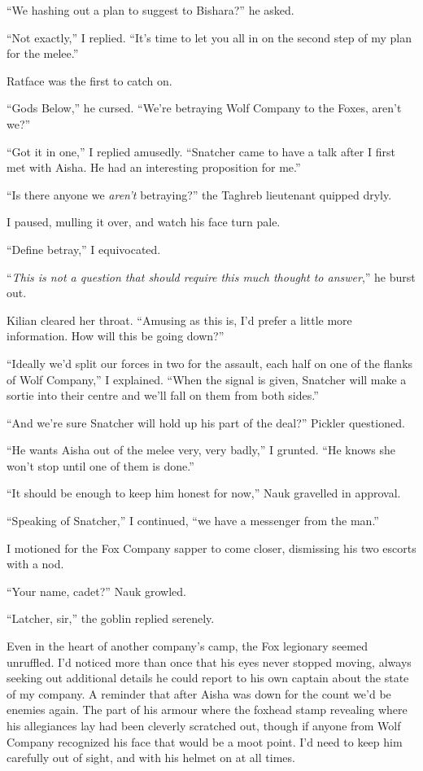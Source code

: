 \documentclass[12pt, openany]{book}
\begin{document}
“We hashing out a plan to suggest to Bishara?” he asked.

“Not exactly,” I replied. “It’s time to let you all in on the second step of my plan for the melee.”

Ratface was the first to catch on.

“Gods Below,” he cursed. “We’re betraying Wolf Company to the Foxes, aren’t we?”

“Got it in one,” I replied amusedly. “Snatcher came to have a talk after I first met with Aisha. He had an interesting proposition for me.”

“Is there anyone we \textit{aren’t} betraying?” the Taghreb lieutenant quipped dryly.

I paused, mulling it over, and watch his face turn pale.

“Define betray,” I equivocated.

“\textit{This is not a question that should require this much thought to answer},” he burst out.

Kilian cleared her throat. “Amusing as this is, I’d prefer a little more information. How will this be going down?”

“Ideally we’d split our forces in two for the assault, each half on one of the flanks of Wolf Company,” I explained. “When the signal is given, Snatcher will make a sortie into their centre and we’ll fall on them from both sides.”

“And we’re sure Snatcher will hold up his part of the deal?” Pickler questioned.

“He wants Aisha out of the melee very, very badly,” I grunted. “He knows she won’t stop until one of them is done.”

“It should be enough to keep him honest for now,” Nauk gravelled in approval.

“Speaking of Snatcher,” I continued, “we have a messenger from the man.”

I motioned for the Fox Company sapper to come closer, dismissing his two escorts with a nod.

“Your name, cadet?” Nauk growled.

“Latcher, sir,” the goblin replied serenely.

Even in the heart of another company’s camp, the Fox legionary seemed unruffled. I’d noticed more than once that his eyes never stopped moving, always seeking out additional details he could report to his own captain about the state of my company. A reminder that after Aisha was down for the count we’d be enemies again. The part of his armour where the foxhead stamp revealing where his allegiances lay had been cleverly scratched out, though if anyone from Wolf Company recognized his face that would be a moot point. I’d need to keep him carefully out of sight, and with his helmet on at all times.
\end{document}
